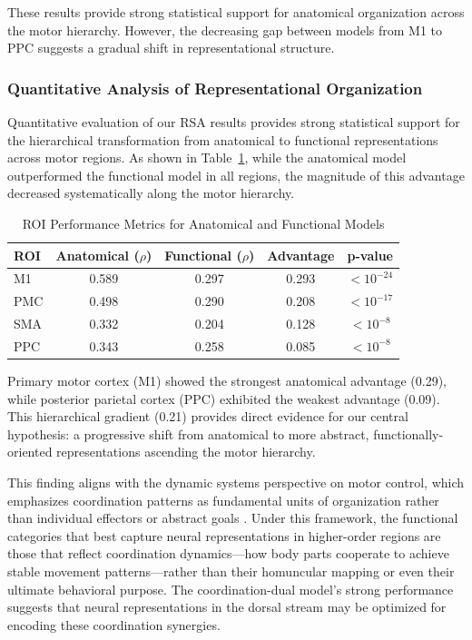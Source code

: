 \documentclass{article}
\begin{document}
These results provide strong statistical support for anatomical organization across the motor hierarchy. However, the decreasing gap between models from M1 to PPC suggests a gradual shift in representational structure.

\subsubsection{Quantitative Analysis of Representational Organization}

Quantitative evaluation of our RSA results provides strong statistical support for the hierarchical transformation from anatomical to functional representations across motor regions. As shown in Table~\ref{tab:roi_metrics}, while the anatomical model outperformed the functional model in all regions, the magnitude of this advantage decreased systematically along the motor hierarchy.

\begin{table}[h]
\centering
\caption{ROI Performance Metrics for Anatomical and Functional Models}
\label{tab:roi_metrics}
\begin{tabular}{|l|c|c|c|c|}
\hline
\textbf{ROI} & \textbf{Anatomical ($\rho$)} & \textbf{Functional ($\rho$)} & \textbf{Advantage} & \textbf{p-value} \\
\hline
M1 & 0.589 & 0.297 & 0.293 & $< 10^{-24}$ \\
PMC & 0.498 & 0.290 & 0.208 & $< 10^{-17}$ \\
SMA & 0.332 & 0.204 & 0.128 & $< 10^{-8}$ \\
PPC & 0.343 & 0.258 & 0.085 & $< 10^{-8}$ \\
\hline
\end{tabular}
\end{table}

Primary motor cortex (M1) showed the strongest anatomical advantage (0.29), while posterior parietal cortex (PPC) exhibited the weakest advantage (0.09). This hierarchical gradient (0.21) provides direct evidence for our central hypothesis: a progressive shift from anatomical to more abstract, functionally-oriented representations ascending the motor hierarchy.

This finding aligns with the dynamic systems perspective on motor control, which emphasizes coordination patterns as fundamental units of organization rather than individual effectors or abstract goals \citep{Kelso1984}. Under this framework, the functional categories that best capture neural representations in higher-order regions are those that reflect coordination dynamics—how body parts cooperate to achieve stable movement patterns—rather than their homuncular mapping or even their ultimate behavioral purpose. The coordination-dual model's strong performance suggests that neural representations in the dorsal stream may be optimized for encoding these coordination synergies.
\end{document}
